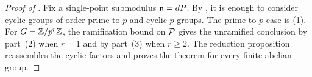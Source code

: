 \begin{proof}[Proof of ]
Fix a single-point submodulus $\mathfrak{n}=dP$. By
, it is enough to consider cyclic
groups of order prime to $p$ and cyclic $p$-groups. The prime-to-$p$ case is
(1). For $G=\mathbb{Z}/p^r\mathbb{Z}$, the
ramification bound on $\mathcal{P}$ gives the unramified conclusion by part~(2) when
$r=1$ and by part~(3) when $r\geq2$. The reduction proposition reassembles
the cyclic factors and proves the theorem for every finite abelian group.
\end{proof}

